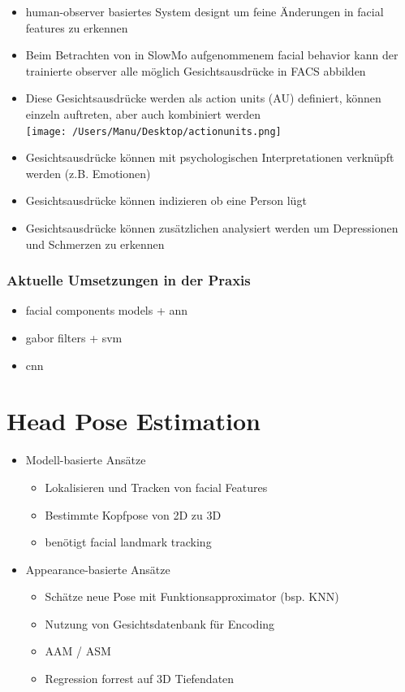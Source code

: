 \documentclass[paper=a4, fontsize=11pt]{scrartcl} %
\numberwithin{equation}{section} %
\numberwithin{figure}{section} %
\numberwithin{table}{section} %
\begin{document}
\begin{itemize}
\item human-observer basiertes System designt um feine Änderungen in facial features zu erkennen
\item Beim Betrachten von in SlowMo aufgenommenem facial behavior kann der trainierte observer alle möglich Gesichtsausdrücke in FACS abbilden
\item  Diese Gesichtsausdrücke werden als action units (AU) definiert, können einzeln auftreten, aber auch kombiniert werden \\ 
\texttt{[image: /Users/Manu/Desktop/actionunits.png]}
\item Gesichtsausdrücke können mit psychologischen Interpretationen verknüpft werden (z.B. Emotionen)
\item Gesichtsausdrücke können indizieren ob eine Person lügt
\item Gesichtsausdrücke können zusätzlichen analysiert werden um Depressionen und Schmerzen zu erkennen
\end{itemize}

\subsubsection{Aktuelle Umsetzungen in der Praxis}

\begin{itemize}
\item facial components models + ann
\item gabor filters + svm
\item cnn
\end{itemize}

\section{Head Pose Estimation}

\begin{itemize}
\item Modell-basierte Ansätze
\begin{itemize}
\item Lokalisieren und Tracken von facial Features
\item Bestimmte Kopfpose von 2D zu 3D 
\item benötigt facial landmark tracking
\end{itemize}
\item Appearance-basierte Ansätze
\begin{itemize}
\item Schätze neue Pose mit Funktionsapproximator (bsp. KNN)
\item Nutzung von Gesichtsdatenbank für Encoding
\item AAM / ASM
\item Regression forrest auf 3D Tiefendaten
\end{itemize}
\end{itemize}
\end{document}
